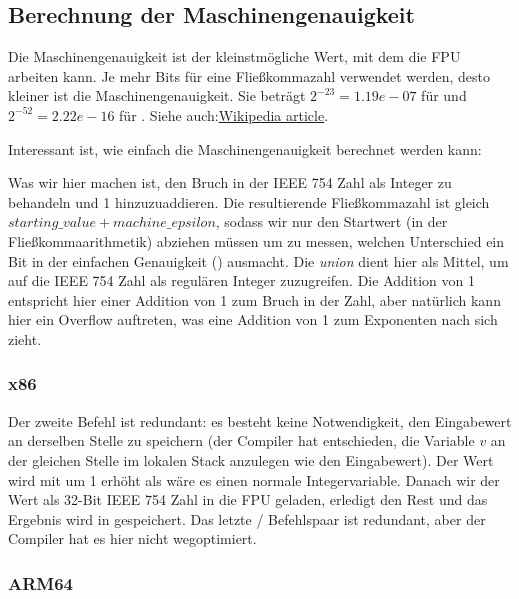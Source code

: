 \subsection{Berechnung der Maschinengenauigkeit}
Die Maschinengenauigkeit ist der kleinstmögliche Wert, mit dem die \ac{FPU} arbeiten kann.
Je mehr Bits für eine Fließkommazahl verwendet werden, desto kleiner ist die Maschinengenauigkeit.
Sie beträgt $2^{-23} = 1.19e-07$ für \Tfloat und $2^{-52} = 2.22e-16$ für \Tdouble.
Siehe auch:\href{http://link.yurichev.com/17367}{Wikipedia article}.

Interessant ist, wie einfach die Maschinengenauigkeit berechnet werden kann:


Was wir hier machen ist, den Bruch in der IEEE 754 Zahl als Integer zu behandeln und 1 hinzuzuaddieren.
Die resultierende Fließkommazahl ist gleich $starting\_value+machine\_epsilon$, sodass wir nur den Startwert (in der
Fließkommaarithmetik) abziehen müssen um zu messen, welchen Unterschied ein Bit in der einfachen Genauigkeit (\Tfloat)
ausmacht.
Die \emph{union} dient hier als Mittel, um auf die IEEE 754 Zahl als regulären Integer zuzugreifen.
Die Addition von 1 entspricht hier einer Addition von 1 zum Bruch in der Zahl, aber natürlich kann hier ein Overflow
auftreten, was eine Addition von 1 zum Exponenten nach sich zieht.

\subsubsection{x86}


Der zweite  Befehl ist redundant: es besteht keine Notwendigkeit, den Eingabewert an derselben Stelle zu
speichern (der Compiler hat entschieden, die Variable $v$ an der gleichen Stelle im lokalen Stack anzulegen wie den
Eingabewert).
Der Wert wird mit  um 1 erhöht als wäre es einen normale Integervariable.
Danach wir der Wert als 32-Bit IEEE 754 Zahl in die FPU geladen,  erledigt den Rest und das Ergebnis wird in
 gespeichert.
Das letzte / Befehlspaar ist redundant, aber der Compiler hat es hier nicht wegoptimiert.

\subsubsection{ARM64}

